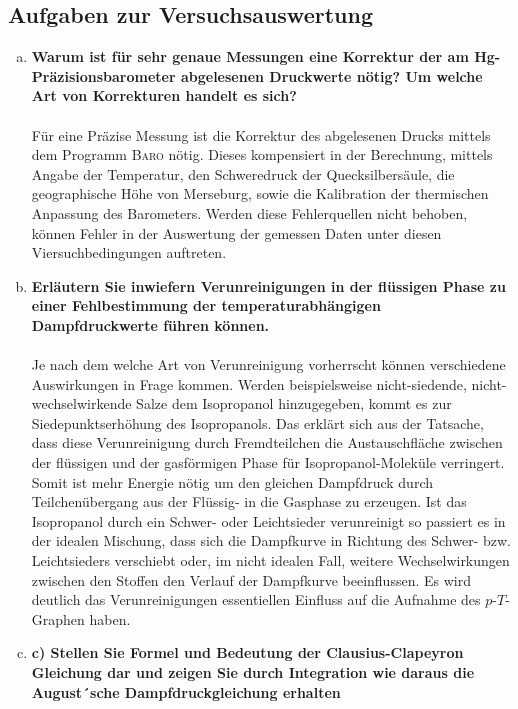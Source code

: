 \newpage

\subsection*{Aufgaben zur Versuchsauswertung}
\begin{enumerate}[a)]
	\item \textbf{Warum ist für sehr genaue Messungen eine Korrektur der am Hg-Präzisionsbarometer abgelesenen Druckwerte nötig? Um welche Art von Korrekturen handelt es sich?}\\\\
	Für eine Präzise Messung ist die Korrektur des abgelesenen Drucks mittels dem Programm \textsc{Baro} nötig. Dieses kompensiert in der Berechnung, mittels Angabe der Temperatur, den Schweredruck der Quecksilbersäule, die geographische Höhe von Merseburg, sowie die Kalibration der thermischen Anpassung des Barometers. Werden diese Fehlerquellen nicht behoben, können Fehler in der Auswertung der gemessen Daten unter diesen Viersuchbedingungen auftreten.
	
	\item \textbf{Erläutern Sie inwiefern Verunreinigungen in der flüssigen Phase zu einer Fehlbestimmung der temperaturabhängigen Dampfdruckwerte führen können.}\\\\
	Je nach dem welche Art von Verunreinigung vorherrscht können verschiedene Auswirkungen in Frage kommen. Werden beispielsweise nicht-siedende, nicht-wechselwirkende Salze dem Isopropanol hinzugegeben, kommt es zur Siedepunktserhöhung des Isopropanols. Das erklärt sich aus der Tatsache, dass diese Verunreinigung durch Fremdteilchen die Austauschfläche zwischen der flüssigen und der gasförmigen Phase für Isopropanol-Moleküle verringert. Somit ist mehr Energie nötig um den gleichen Dampfdruck durch Teilchenübergang aus der Flüssig- in die Gasphase zu erzeugen.\linebreak
	Ist das Isopropanol durch ein Schwer- oder Leichtsieder verunreinigt so passiert es in der idealen Mischung, dass sich die Dampfkurve in Richtung des Schwer- bzw. Leichtsieders verschiebt oder, im nicht idealen Fall, weitere Wechselwirkungen zwischen den Stoffen den Verlauf der Dampfkurve beeinflussen.\linebreak
	Es wird deutlich das Verunreinigungen essentiellen Einfluss auf die Aufnahme des $p$-$T$-Graphen haben.
	
	\item \textbf{c) Stellen Sie Formel und Bedeutung der Clausius-Clapeyron Gleichung dar und zeigen Sie durch Integration wie daraus die August´sche Dampfdruckgleichung erhalten}\\
	

\end{enumerate}
